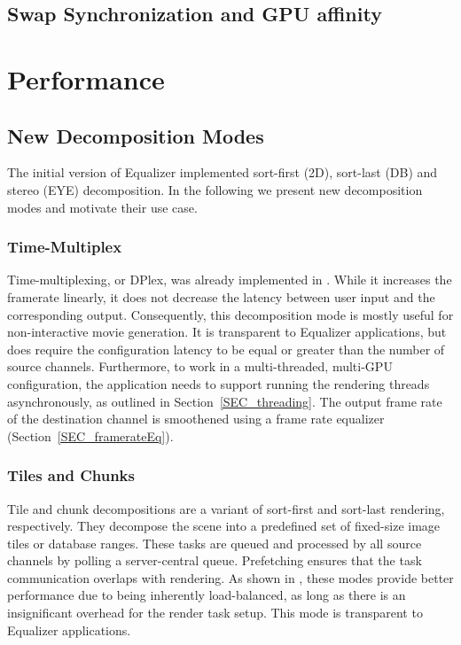 \documentclass[10pt,journal,compsoc]{IEEEtran}
\newcommand{\sref}[1]{Section~\ref{#1}}
\begin{document}
\subsection{Swap Synchronization and GPU affinity}\label{sec:swap}

\section{Performance}

\subsection{New Decomposition Modes}

The initial version of Equalizer implemented sort-first (2D), sort-last (DB) and
stereo (EYE) decomposition. In the following we present new decomposition modes
and motivate their use case.

\subsubsection{Time-Multiplex}

Time-multiplexing, or DPlex, was already implemented in \cite{BRE:05}. While it
increases the framerate linearly, it does not decrease the latency between user
input and the corresponding output. Consequently, this decomposition mode is
mostly useful for non-interactive movie generation. It is transparent to
Equalizer applications, but does require the configuration latency to be equal
or greater than the number of source channels. Furthermore, to work in a
multi-threaded, multi-GPU configuration, the application needs to support
running the rendering threads asynchronously, as outlined in
\sref{SEC_threading}. The output frame rate of the destination channel is
smoothened using a frame rate equalizer (\sref{SEC_framerateEq}).

\subsubsection{Tiles and Chunks}\label{sec:tile}

Tile and chunk decompositions are a variant of sort-first and sort-last
rendering, respectively. They decompose the scene into a predefined set of
fixed-size image tiles or database ranges. These tasks are queued and processed
by all source channels by polling a server-central queue. Prefetching ensures
that the task communication overlaps with rendering. As shown in \cite{SPEP:16},
these modes provide better performance due to being inherently load-balanced, as
long as there is an insignificant overhead for the render task setup. This mode
is transparent to Equalizer applications.
\end{document}
